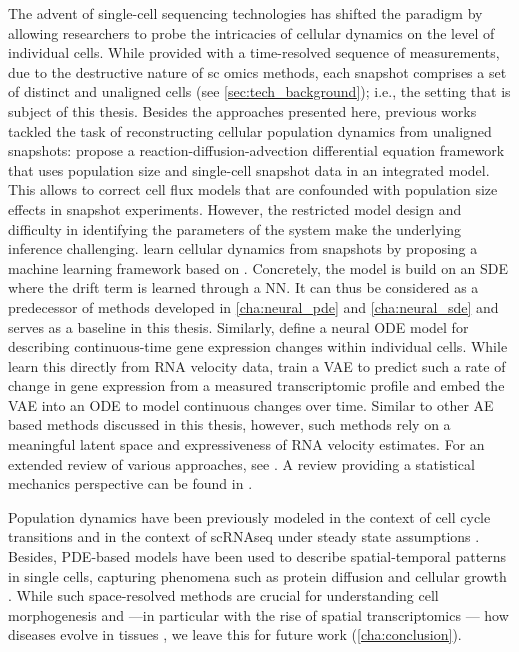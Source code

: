 The advent of single-cell sequencing technologies has shifted the paradigm by allowing researchers to probe the intricacies of cellular dynamics on the level of individual cells.
While provided with a time-resolved sequence of measurements, due to the destructive nature of \acrlong{sc} omics methods, each snapshot comprises a set of distinct and unaligned cells (see \cref{sec:tech_background}); i.e., the setting that is subject of this thesis.
Besides the approaches presented here, previous works tackled the task of reconstructing cellular population dynamics from unaligned snapshots:
\citet{fischer2019inferring} propose a reaction-diffusion-advection differential equation framework that uses population size and single-cell snapshot data in an integrated model. This allows to correct cell flux models that are confounded with population size effects in snapshot experiments. However, the restricted model design and difficulty in identifying the parameters of the system make the underlying inference challenging.
\citet{hashimoto2016learning} learn cellular dynamics from snapshots by proposing a machine learning framework based on . Concretely, the model is build on an \acrshort{SDE} where the drift term is learned through a \acrlong{NN}. It can thus be considered as a predecessor of methods developed in \cref{cha:neural_pde} and \ref{cha:neural_sde} and serves as a baseline in this thesis.
Similarly, \citet{chen2022deepvelo, qiu2022mapping, tong2020trajectorynet, huguet2022manifold} define a neural \acrshort{ODE} model \citep{chen2018neural} for describing continuous-time gene expression changes within individual cells.
While \citet{qiu2022mapping} learn this directly from \acrshort{RNA} velocity data, \citet{chen2022deepvelo} train a \acrfull{VAE} to predict such a rate of change in gene expression from a measured transcriptomic profile and embed the \acrshort{VAE} into an \acrshort{ODE} to model continuous changes over time.
Similar to other \acrshort{AE} based methods discussed in this thesis, however, such methods rely on a meaningful latent space and expressiveness of \acrshort{RNA} velocity estimates.
For an extended review of various approaches, see \citet{ding2022temporal}. A review providing a statistical mechanics perspective can be found in \citet{teschendorff2021statistical}.

Population dynamics have been previously modeled in the context of cell cycle transitions \citep{kafri2013dynamics, kuritz2017relationship} and in the context of \acrshort{sc}\acrshort{RNAseq} under steady state assumptions \citep{weinreb2018fundamental}.
Besides, \acrshort{PDE}-based models have been used to describe spatial-temporal patterns in single cells, capturing phenomena such as protein diffusion and cellular growth \citep{turing1990chemical, erban2004individual}. While such space-resolved methods are crucial for understanding cell morphogenesis and ---in particular with the rise of spatial transcriptomics \citep{marx2021method}--- how diseases evolve in tissues \citep{fischer2023modeling, ren2022identifying}, we leave this for future work (\cref{cha:conclusion}).


